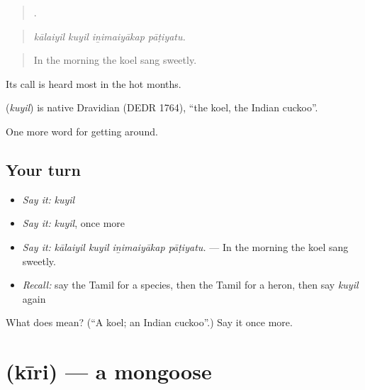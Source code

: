 \begin{quote}
   .
\end{quote}

\begin{quote}
\emph{kālaiyil kuyil iṉimaiyākap pāṭiyatu.}
\end{quote}

\begin{quote}
In the morning the koel sang sweetly.
\end{quote}

Its call is heard most in the hot months.

\begin{cousinweb}
\textbf{} (\emph{kuyil}) is native Dravidian (DEDR 1764), \textquotedblleft{}the koel, the Indian cuckoo\textquotedblright{}.
\end{cousinweb}

\begin{grammarlens}[title={What you've built}]
One more word for getting around.
\end{grammarlens}

\subsection*{Your turn}
\begin{itemize}
\raggedright
  \item \emph{Say it:} \emph{kuyil}
  \item \emph{Say it:} \emph{kuyil}, once more
  \item \emph{Say it:} \emph{kālaiyil kuyil iṉimaiyākap pāṭiyatu.} — In the morning the koel sang sweetly.
  \item \emph{Recall:} say the Tamil for a species, then the Tamil for a heron, then say \emph{kuyil} again
\end{itemize}

\begin{tcolorbox}[breakable,colback=teal!4,colframe=teal!35!black,title={Before you move on}]
What does  mean? (\textquotedblleft{}A koel; an Indian cuckoo\textquotedblright{}.) Say it once more.
\end{tcolorbox}
\section[\texorpdfstring{\ta{கீரி} (kīri)}{கீரி (kīri)}]{ (kīri) — a mongoose}

\label{lesson:TA-C438-kiri}



